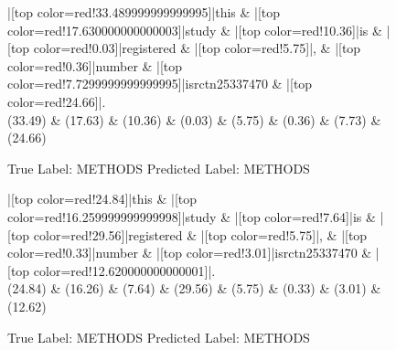\documentclass[a4paper, landscape]{article}
\begin{document}
\clearpage
\begin{figure}
\begin{center}
\begin{dependency}
\begin{deptext}
|[top color=red!33.489999999999995]|this \& |[top color=red!17.630000000000003]|study \& |[top color=red!10.36]|is \& |[top color=red!0.03]|registered \& |[top color=red!5.75]|, \& |[top color=red!0.36]|number \& |[top color=red!7.7299999999999995]|isrctn25337470 \& |[top color=red!24.66]|.\\
(33.49) \& (17.63) \& (10.36) \& (0.03) \& (5.75) \& (0.36) \& (7.73) \& (24.66)\\
\end{deptext}
\end{dependency}
\end{center}
\caption{True Label: METHODS Predicted Label: METHODS}
\end{figure}
\clearpage
\begin{figure}
\begin{center}
\begin{dependency}
\begin{deptext}
|[top color=red!24.84]|this \& |[top color=red!16.259999999999998]|study \& |[top color=red!7.64]|is \& |[top color=red!29.56]|registered \& |[top color=red!5.75]|, \& |[top color=red!0.33]|number \& |[top color=red!3.01]|isrctn25337470 \& |[top color=red!12.620000000000001]|.\\
(24.84) \& (16.26) \& (7.64) \& (29.56) \& (5.75) \& (0.33) \& (3.01) \& (12.62)\\
\end{deptext}
\end{dependency}
\end{center}
\caption{True Label: METHODS Predicted Label: METHODS}
\end{figure}
\clearpage
\end{document}
